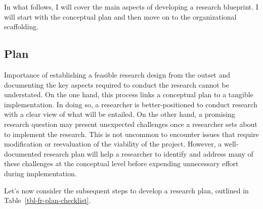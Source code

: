 \documentclass[
  letterpaper,
]{latex/krantz}
\theoremstyle{definition}
\theoremstyle{remark}
\begin{document}
In what follows, I will cover the main aspects of developing a research
blueprint. I will start with the conceptual plan and then move on to the
organizational scaffolding.

\subsection{Plan}\label{sec-fr-plan}

Importance of establishing a feasible research design from the outset
and documenting the key aspects required to conduct the research cannot
be understated. On the one hand, this process links a conceptual plan to
a tangible implementation. In doing so, a researcher is
better-positioned to conduct research with a clear view of what will be
entailed. On the other hand, a promising research question may present
unexpected challenges once a researcher sets about to implement the
research. This is not uncommon to encounter issues that require
modification or reevaluation of the viability of the project. However, a
well-documented research plan will help a researcher to identify and
address many of these challenges at the conceptual level before
expending unnecessary effort during implementation.

Let's now consider the subsequent steps to develop a research plan,
outlined in Table~\ref{tbl-fr-plan-checklist}.
\end{document}
